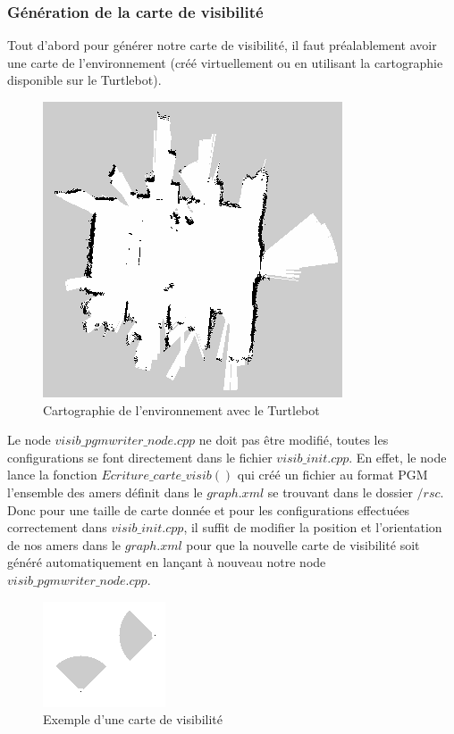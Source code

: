 \documentclass[10pt,a4paper]{article}
\begin{document}
\subsubsection{Génération de la carte de visibilité}
Tout d'abord pour générer notre carte de visibilité, il faut préalablement avoir une carte de l'environnement (créé virtuellement ou en utilisant la cartographie disponible sur le Turtlebot).\\

\begin{figure}[!h]
\center
\includegraphics[scale=0.6]{figures/aip_map.png} 
\caption{Cartographie de l'environnement avec le Turtlebot}	
\end{figure}

Le node $visib\_pgmwriter\_node.cpp$ ne doit pas être modifié, toutes les configurations se font directement dans le fichier $visib\_init.cpp$. En effet, le node lance la fonction $Ecriture\_carte\_visib()$ qui créé un fichier au format PGM l'ensemble des amers définit dans le $graph.xml$ se trouvant dans le dossier $/rsc$. Donc pour une taille de carte donnée et pour les configurations effectuées correctement dans $visib\_init.cpp$, il suffit de modifier la position et l'orientation de nos amers dans le $graph.xml$ pour que la nouvelle carte de visibilité soit généré automatiquement en lançant à nouveau notre node $visib\_pgmwriter\_node.cpp$.\\

\begin{figure}[!h]
\center
\includegraphics{figures/visib.png} 
\caption{Exemple d'une carte de visibilité}	
\end{figure}
\end{document}
